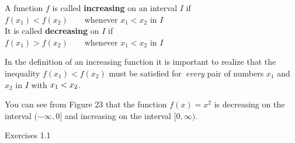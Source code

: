 \documentclass{sebase}
\begin{document}
%
\STARTBOX%
\vspace{3pt}A function $f$ is called \textbf{increasing} on an interval $I$
if\\[6pt]
\hspace*{\fill}$f(x_{1})<f(x_{2})\qquad $whenever $x_{1}<x_{2}$ in $I$%
\hspace*{\fill}\\[6pt]
It is called \textbf{decreasing} on $I$ if \\[6pt]
\hspace*{\fill}$f(x_{1})>f(x_{2})\qquad $whenever $x_{1}<x_{2}$ in $I$%
\hspace*{\fill}\vspace*{6pt}%
\ENDBOX%

In the definition of an increasing function it is important to realize that
the inequality $f(x_{1})<f(x_{2})$ must be satisfied for\textit{\ every}
pair of numbers $x_{1}$ and $x_{2}$ in $I$ with $x_{1}\nolinebreak
<\nolinebreak x_{2}$.

You can see from Figure 23 that the function $f(x)=x^{2}$ is decreasing on
the interval $(-\infty ,0]$ and increasing on the interval $[0,\infty )$.

Exercises 1.1
\end{document}
